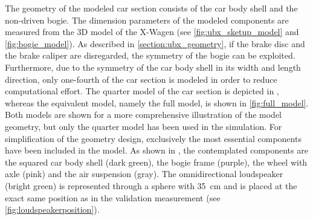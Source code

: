 The geometry of the modeled car section consists of the car body shell and the non-driven bogie. The dimension parameters of the modeled components are measured from the 3D model of the X-Wagen (see \cref{fig:ubx_sketup_model} and \cref{fig:bogie_model}).
As described in \cref{section:ubx_geometry}, if the brake disc and the brake caliper are disregarded, the symmetry of the bogie can be exploited. Furthermore, due to the symmetry of the car body shell in its width and length direction, only one-fourth of the car section is modeled in order to reduce computational effort. The quarter model of the car section is depicted in , whereas the equivalent model, namely the full model, is shown in \cref{fig:full_model}. Both models are shown for a more comprehensive illustration of the model geometry, but only the quarter model has been used in the simulation. For simplification of the geometry design, exclusively the most essential components have been included in the model. As shown in , the contemplated components are the squared car body shell (dark green), the bogie frame (purple), the wheel with axle (pink) and the air suspension (gray). The omnidirectional loudspeaker (bright green) is represented through a sphere with \SI{35}{\centi\meter} and is placed at the exact same position as in the validation measurement (see \cref{fig:loudspeakerposition}). 

